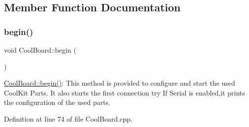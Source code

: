 \subsection{Member Function Documentation}
\mbox{\label{class_cool_board_acba7c5aef7268b2c0044bdb54d3b9d76}} 
\subsubsection{\texorpdfstring{begin()}{begin()}}
{\footnotesize\ttfamily void Cool\+Board\+::begin (\begin{DoxyParamCaption}{ }\end{DoxyParamCaption})}

\hyperlink{class_cool_board_acba7c5aef7268b2c0044bdb54d3b9d76}{Cool\+Board\+::begin()}\+: This method is provided to configure and start the used Cool\+Kit Parts. It also starts the first connection try If Serial is enabled,it prints the configuration of the used parts. 

Definition at line 74 of file Cool\+Board.\+cpp.


